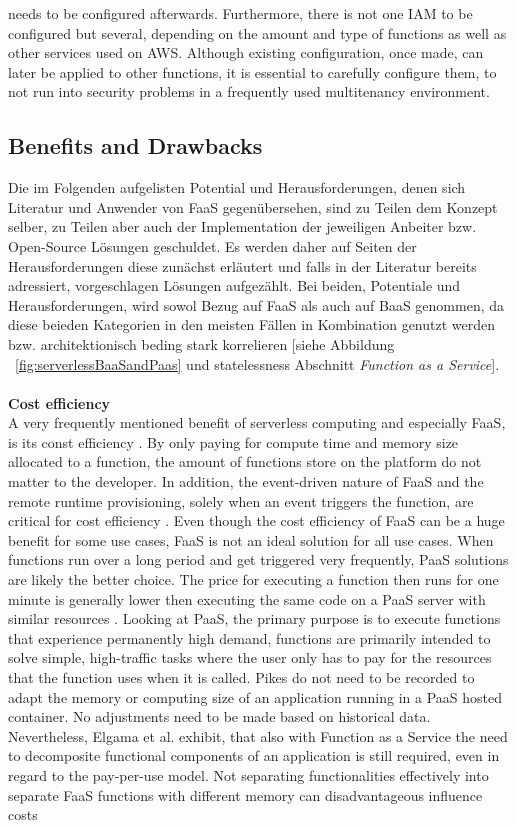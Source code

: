 \documentclass[11pt]{article}
\begin{document}
needs to be configured afterwards. Furthermore, there is not one IAM to be configured but several, depending on the amount and type of functions as well as other services used on AWS. Although existing configuration, once made, can later be applied to other functions, it is essential to carefully configure them, to not run into security problems in a frequently used multitenancy environment.
\subsection{Benefits and Drawbacks}
Die im Folgenden aufgelisten Potential und Herausforderungen, denen sich Literatur und Anwender von FaaS gegenübersehen, sind zu Teilen dem Konzept selber, zu Teilen aber auch der Implementation der jeweiligen Anbeiter bzw. Open-Source Lösungen geschuldet. Es werden daher auf Seiten der Herausforderungen diese zunächst erläutert und falls in der Literatur bereits adressiert, vorgeschlagen Lösungen aufgezählt. Bei beiden, Potentiale und Herausforderungen, wird sowol Bezug auf FaaS als auch auf BaaS genommen, da diese beieden Kategorien in den meisten Fällen in Kombination genutzt werden bzw. architektionisch beding stark korrelieren [siehe Abbildung ~\ref{fig:serverlessBaaSandPaas} und \glqq statelessness\grqq{} Abschnitt \textit{Function as a Service}].\\\\ \textbf{Cost efficiency}\\ A very frequently mentioned benefit of serverless computing and especially FaaS, is its const efficiency \cite{lee2018evaluation}. By only paying for compute time and memory size allocated to a function, the amount of functions store on the platform do not matter to the developer. In addition, the event-driven nature of FaaS and the remote runtime provisioning, solely when an event triggers the function, are critical for cost efficiency \cite{feng2018exploring}. Even though the cost efficiency of FaaS can be a huge benefit for some use cases, FaaS is not an ideal solution for all use cases. When functions run over a long period and get triggered very frequently, PaaS solutions are likely the better choice. The price for executing a function then runs for one minute is generally lower then executing the same code on a PaaS server with similar resources \cite{jonas2019cloud}. Looking at PaaS, the primary purpose is to execute functions that experience permanently high demand, functions are primarily intended to solve simple, high-traffic tasks where the user only has to pay for the resources that the function uses when it is called. Pikes do not need to be recorded to adapt the memory or computing size of an application running in a PaaS hosted container. No adjustments need to be made based on historical data. Nevertheless, Elgama et al. exhibit, that also with Function as a Service the need to decomposite functional components of an application is still required, even in regard to the pay-per-use model. Not separating functionalities effectively into separate FaaS functions with different memory can disadvantageous influence costs 
\end{document}
